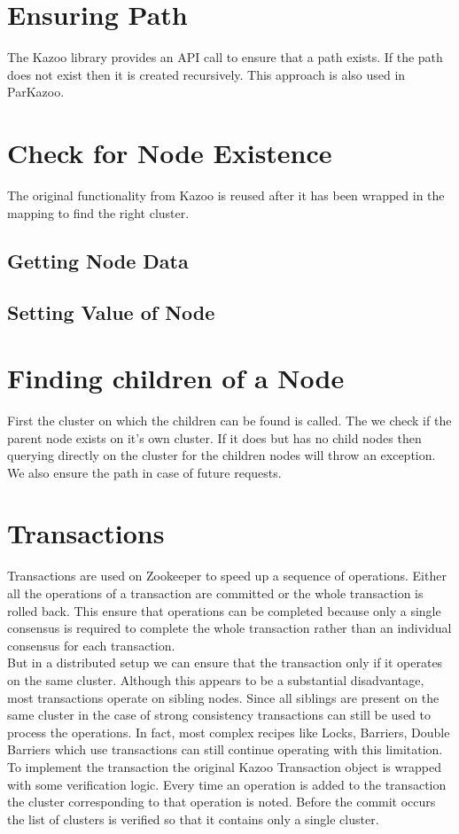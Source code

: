 \section{Ensuring Path}
The Kazoo library provides an API call to ensure that a path exists. If the path does not exist then it is created recursively. This approach is also used in ParKazoo.

\section{Check for Node Existence}
The original functionality from Kazoo is reused after it has been wrapped in the mapping to find the right cluster.

\subsection{Getting Node Data}
\subsection{Setting Value of Node}

\section{Finding children of a Node}
    First the cluster on which the children can be found is called. The we check if the parent node exists on it's own cluster. If it does but has no child nodes then querying directly on the cluster for the children nodes will throw an exception. We also ensure the path in case of future requests.


\section{Transactions}
Transactions are used on Zookeeper to speed up a sequence of operations. Either all the operations of a transaction are committed or the whole transaction is rolled back. This ensure that operations can be completed because only a single consensus is required to complete the whole transaction rather than an individual consensus for each transaction.\\
    But in a distributed setup we can ensure that the transaction only if it operates on the same cluster. Although this appears to be a substantial disadvantage, most transactions operate on sibling nodes. Since all siblings are present on the same cluster in the case of strong consistency transactions can still be used to process the operations. In fact, most complex recipes like Locks, Barriers, Double Barriers which use transactions can still continue operating with this limitation.
    To implement the transaction the original Kazoo Transaction object is wrapped with some verification logic. Every time an operation is added to the transaction the cluster corresponding to that operation is noted. Before the commit occurs the list of clusters is verified so that it contains only a single cluster.
    

